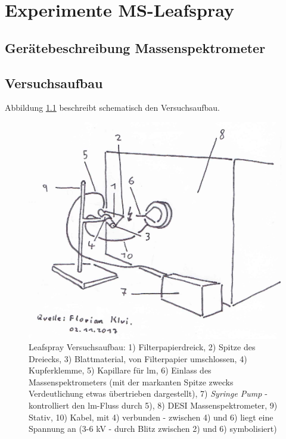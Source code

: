 \chapter{Experimente MS-Leafspray} \label{sec:MSLeafspray}

\section{Gerätebeschreibung Massenspektrometer}

\section{Versuchsaufbau} \label{sec:Versuchsaufbau}

Abbildung \ref{fig:LeafsprayVersuchsaufbau} beschreibt schematisch den Versuchsaufbau. 

\begin{figure}[!hbtp]
  \centering
  \includegraphics[scale=0.5]{figures/Kapitel4/VWA_MSLeafspray_Versuchsaufbau.png}
  \caption[MS Leafspray Versuchsaufbau, Quelle: Autor]{Leafspray Versuchsaufbau: 1) Filterpapierdreick, 2) Spitze des Dreiecks, 3) Blattmaterial, von Filterpapier umschlossen, 4) Kupferklemme, 5) Kapillare für \gls{lm}, 6) Einlass des Massenspektrometers (mit der markanten Spitze zwecks Verdeutlichung etwas übertrieben dargestellt), 7) \textit{Syringe Pump} - kontrolliert den \gls{lm}-Fluss durch 5), 8) DESI Massenspektrometer, 9) Stativ, 10) Kabel, mit 4) verbunden - zwischen 4) und 6) liegt eine Spannung   an (3-6 kV - durch Blitz zwischen 2) und 6) symbolisiert)}
  \label{fig:LeafsprayVersuchsaufbau}
\end{figure}

